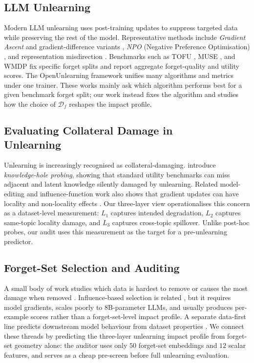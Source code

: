 \documentclass[11pt]{article}
\newcommand{\Df}{\mathcal{D}_f}
\newcommand{\Lone}{L_1}
\newcommand{\Ltwo}{L_2}
\newcommand{\Lthree}{L_3}
\begin{document}
\subsection{LLM Unlearning}
Modern LLM unlearning uses post-training updates to suppress targeted data
while preserving the rest of the model. Representative methods include
\emph{Gradient Ascent} and gradient-difference variants
\citep{jang2023knowledge}, \emph{NPO} (Negative Preference Optimisation)
\citep{zhang2024negative}, and representation misdirection
\citep{li2024wmdp}. Benchmarks such as TOFU \citep{maini2024tofu}, MUSE
\citep{shi2024muse}, and WMDP \citep{li2024wmdp} fix specific forget splits
and report aggregate forget-quality and utility scores. The OpenUnlearning
framework \citep{dorna2025openunlearning} unifies many algorithms and metrics
under one trainer. These works mainly ask which algorithm performs best for a
given benchmark forget split; our work instead fixes the algorithm and studies
how the choice of $\Df$ reshapes the impact profile.

\subsection[Evaluating Collateral Damage in Unlearning]{Evaluating Collateral Damage in\\ Unlearning}
Unlearning is increasingly recognised as collateral-damaging. \citet{ko2025probing}
introduce \emph{knowledge-hole probing}, showing that standard utility
benchmarks can miss adjacent and latent knowledge silently damaged by
unlearning. Related model-editing and influence-function work also shows that
gradient updates can have locality and non-locality effects
\citep{meng2022locating, mitchell2022memory, koh2017understanding,
grosse2023studying}. Our three-layer view operationalises this concern as a
dataset-level measurement: $\Lone$ captures intended degradation, $\Ltwo$
captures same-topic locality damage, and $\Lthree$ captures cross-topic
spillover. Unlike post-hoc probes, our audit uses this measurement as the
target for a pre-unlearning predictor.

\subsection{Forget-Set Selection and Auditing}
A small body of work studies which data is hardest to remove or causes the
most damage when removed \citep{thudi2022unrolling, kurmanji2024towards}.
Influence-based selection is related \citep{koh2017understanding}, but it
requires model gradients, scales poorly to 8B-parameter LLMs, and usually
produces per-example scores rather than a forget-set-level impact profile. A
separate data-first line predicts downstream model behaviour from dataset
properties \citep{dang2024curious, ilyas2022datamodels,
yao2020pyhessian}. We connect these threads by predicting the three-layer
unlearning impact profile from forget-set geometry alone: the auditor uses
only $50$ forget-set embeddings and $12$ scalar features, and serves as a
cheap pre-screen before full unlearning evaluation.
\end{document}
